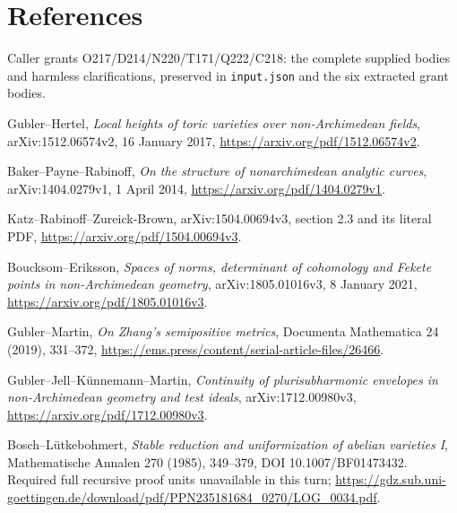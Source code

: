 \documentclass[
  11pt,
]{article}
\begin{document}
\section{References}\label{references}

Caller grants O217/D214/N220/T171/Q222/C218: the complete supplied
bodies and harmless clarifications, preserved in \texttt{input.json} and
the six extracted grant bodies.

Gubler--Hertel, \emph{Local heights of toric varieties over
non-Archimedean fields}, arXiv:1512.06574v2, 16 January 2017,
\url{https://arxiv.org/pdf/1512.06574v2}.

Baker--Payne--Rabinoff, \emph{On the structure of nonarchimedean
analytic curves}, arXiv:1404.0279v1, 1 April 2014,
\url{https://arxiv.org/pdf/1404.0279v1}.

Katz--Rabinoff--Zureick-Brown, arXiv:1504.00694v3, section 2.3 and its
literal PDF, \url{https://arxiv.org/pdf/1504.00694v3}.

Boucksom--Eriksson, \emph{Spaces of norms, determinant of cohomology and
Fekete points in non-Archimedean geometry}, arXiv:1805.01016v3, 8
January 2021, \url{https://arxiv.org/pdf/1805.01016v3}.

Gubler--Martin, \emph{On Zhang's semipositive metrics}, Documenta
Mathematica 24 (2019), 331--372,
\url{https://ems.press/content/serial-article-files/26466}.

Gubler--Jell--Künnemann--Martin, \emph{Continuity of plurisubharmonic
envelopes in non-Archimedean geometry and test ideals},
arXiv:1712.00980v3, \url{https://arxiv.org/pdf/1712.00980v3}.

Bosch--Lütkebohmert, \emph{Stable reduction and uniformization of
abelian varieties I}, Mathematische Annalen 270 (1985), 349--379, DOI
10.1007/BF01473432. Required full recursive proof units unavailable in
this turn;
\url{https://gdz.sub.uni-goettingen.de/download/pdf/PPN235181684_0270/LOG_0034.pdf}.
\end{document}
